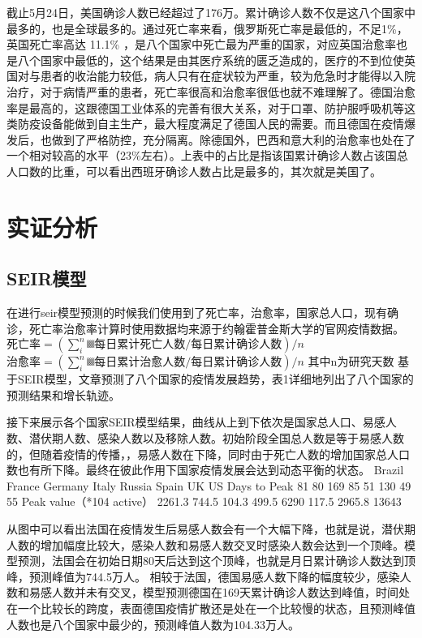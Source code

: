 \documentclass[lang=cn,11pt,a4paper,cite=authoryear]{elegantpaper}
\begin{document}
截止5月24日，美国确诊人数已经超过了176万。累计确诊人数不仅是这八个国家中最多的，也是全球最多的。通过死亡率来看，俄罗斯死亡率是最低的，不足1\%，英国死亡率高达 11.1\% ，是八个国家中死亡最为严重的国家，对应英国治愈率也是八个国家中最低的，这个结果是由其医疗系统的匮乏造成的，医疗的不到位使英国对与患者的收治能力较低，病人只有在症状较为严重，较为危急时才能得以入院治疗，对于病情严重的患者，死亡率很高和治愈率很低也就不难理解了。德国治愈率是最高的，这跟德国工业体系的完善有很大关系，对于口罩、防护服呼吸机等这类防疫设备能做到自主生产，最大程度满足了德国人民的需要。而且德国在疫情爆发后，也做到了严格防控，充分隔离。除德国外，巴西和意大利的治愈率也处在了一个相对较高的水平（23\%左右）。上表中的占比是指该国累计确诊人数占该国总人口数的比重，可以看出西班牙确诊人数占比是最多的，其次就是美国了。

\section{实证分析}

\subsection{SEIR模型}
在进行seir模型预测的时候我们使用到了死亡率，治愈率，国家总人口，现有确诊，死亡率治愈率计算时使用数据均来源于约翰霍普金斯大学的官网疫情数据。
$死亡率=(∑_i^n▒每日累计死亡人数/每日累计确诊人数)/n$
$治愈率=(∑_i^n▒每日累计治愈人数/每日累计确诊人数)/n$
其中n为研究天数
基于SEIR模型，文章预测了八个国家的疫情发展趋势，表1详细地列出了八个国家的预测结果和增长轨迹。

接下来展示各个国家SEIR模型结果，曲线从上到下依次是国家总人口、易感人数、潜伏期人数、感染人数以及移除人数。初始阶段全国总人数是等于易感人数的，但随着疫情的传播，，易感人数在下降，同时由于死亡人数的增加国家总人口数也有所下降。最终在彼此作用下国家疫情发展会达到动态平衡的状态。
	Brazil	France	Germany	Italy	Russia	Spain	UK	US
Days to Peak	81	80	169	85	51	130	49	55
Peak value（*104 active）	2261.3	744.5	104.3	499.5	6290	117.5	2965.8	13643

从图中可以看出法国在疫情发生后易感人数会有一个大幅下降，也就是说，潜伏期人数的增加幅度比较大，感染人数和易感人数交叉时感染人数会达到一个顶峰。模型预测，法国会在初始日期80天后达到这个顶峰，也就是月日累计确诊人数达到顶峰，预测峰值为744.5万人。
相较于法国，德国易感人数下降的幅度较少，感染人数和易感人数并未有交叉，模型预测德国在169天累计确诊人数达到峰值，时间处在一个比较长的跨度，表面德国疫情扩散还是处在一个比较慢的状态，且预测峰值人数也是八个国家中最少的，预测峰值人数为104.33万人。
\end{document}
